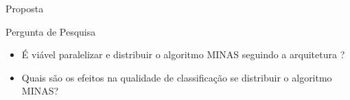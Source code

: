\documentclass[aspectratio=1610,10pt]{beamer}
\newcommand{\minas}{MINAS\xspace}
\begin{document}
\begin{frame}[fragile]{Proposta}
  \begin{block}{Pergunta de Pesquisa}
    \begin{itemize}
      \item É viável paralelizar e distribuir o algoritmo \minas seguindo a arquitetura \arch?
      \item Quais são os efeitos na qualidade de classificação se distribuir o algoritmo \minas?
      


    \end{itemize}
  \end{block}
\end{frame}
\end{document}
